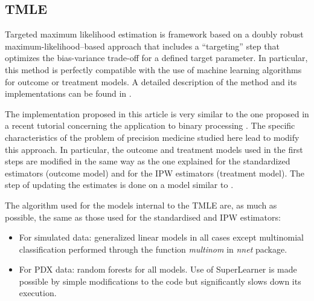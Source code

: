 \documentclass[a4paper,12pt,twoside,onecolumn,openright,final,oldfontcommands]{memoir}
\providecommand{\tightlist}{%
  \setlength{\itemsep}{0pt}\setlength{\parskip}{0pt}}
\begin{document}
\subsection{TMLE}\label{appendix-TMLE}

Targeted maximum likelihood estimation is framework based on a doubly
robust maximum-likelihood--based approach that includes a ``targeting''
step that optimizes the bias-variance trade-off for a defined target
parameter. In particular, this method is perfectly compatible with the
use of machine learning algorithms for outcome or treatment models. A
detailed description of the method and its implementations can be found
in \citet{van2011targeted}.

The implementation proposed in this article is very similar to the one
proposed in a recent tutorial concerning the application to binary
processing \citep{luque2018targeted}. The specific characteristics of
the problem of precision medicine studied here lead to modify this
approach. In particular, the outcome and treatment models used in the
first steps are modified in the same way as the one explained for the
standardized estimators (outcome model) and for the IPW estimators
(treatment model). The step of updating the estimates is done on a model
similar to \citet{luque2018targeted}.

The algorithm used for the models internal to the TMLE are, as much as
possible, the same as those used for the standardised and IPW
estimators:

\begin{itemize}
\tightlist
\item
  For simulated data: generalized linear models in all cases except
  multinomial classification performed through the function
  \emph{multinom} in \emph{nnet} package.
\item
  For PDX data: random forests for all models. Use of SuperLearner
  \citep{van2007super} is made possible by simple modifications to the
  code but significantly slows down its execution.
\end{itemize}


\end{document}
